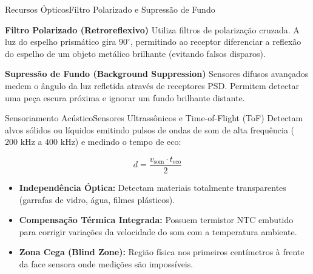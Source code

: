 \begin{senaiframe}{Recursos Ópticos}{Filtro Polarizado e Supressão de Fundo}
  \begin{block}{\textbf{Filtro Polarizado (Retroreflexivo)}}
    Utiliza filtros de polarização cruzada. A luz do espelho prismático gira $90^\circ$, permitindo ao receptor diferenciar a reflexão do espelho de um objeto metálico brilhante (evitando falsos disparos).
  \end{block}

  \vspace{4pt}
  \begin{block}{\textbf{Supressão de Fundo (Background Suppression)}}
    Sensores difusos avançados medem o ângulo da luz refletida através de receptores PSD. Permitem detectar uma peça escura próxima e ignorar um fundo brilhante distante.
  \end{block}
\end{senaiframe}

\begin{senaiframe}{Sensoriamento Acústico}{Sensores Ultrassônicos e Time-of-Flight (ToF)}
  Detectam alvos sólidos ou líquidos emitindo pulsos de ondas de som de alta frequência ($200\text{ kHz}$ a $400\text{ kHz}$) e medindo o tempo de eco:

  $$d = \frac{v_{\text{som}} \cdot t_{\text{eco}}}{2}$$

  \begin{itemize}
    \item \textbf{Independência Óptica:} Detectam materiais totalmente transparentes (garrafas de vidro, água, filmes plásticos).
    \item \textbf{Compensação Térmica Integrada:} Possuem termistor NTC embutido para corrigir variações da velocidade do som com a temperatura ambiente.
    \item \textbf{Zona Cega (Blind Zone):} Região física nos primeiros centímetros à frente da face sensora onde medições são impossíveis.
  \end{itemize}
\end{senaiframe}

